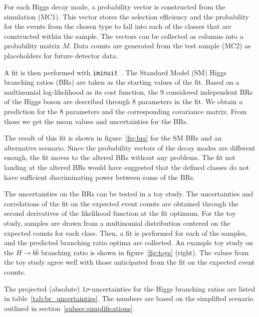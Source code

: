 \documentclass[11pt, hidelinks, a4paper]{scrartcl}
\begin{document}
For each Higgs decay mode, a probability vector is
constructed from the simulation (MC1).
This vector stores the selection efficiency and the probability
for the events from the chosen type to fall into each of the classes
that are constructed within the sample.
The vectors can be collected as columns into a probability matrix $M$.
Data counts are generated from the test sample (MC2)
as placeholders for future detector data.

A fit is then performed with \texttt{iminuit}~\cite{Minuit,iminuit}.
The Standard Model (SM) Higgs branching ratios (BRs)
are taken
as the starting values of the fit.
Based on a multinomial log-likelihood as its cost function,
the 9 considered independent BRs of the Higgs boson
are described through 8 parameters in the fit.
We obtain a prediction for the 8 parameters
and the corresponding covariance matrix.
From those we get the mean values and uncertainties for the BRs.

The result of this fit is shown in figure~\ref{fig:brs} for
the SM BRs and an alternative scenario.
Since the probability vectors of the decay modes are different enough,
the fit moves to the altered BRs without any problems.
The fit not landing at the altered BRs
would have suggested that the defined classes
do not have sufficient discriminating power
between some of the BRs.

The uncertainties on the BRs can be tested in a toy study.
The uncertainties and correlations of the fit on the expected event counts
are obtained through the second derivatives of the likelihood function
at the fit optimum.
For the toy study, samples are drawn from a multinomial distribution centered on the
expected counts for each class.
Then, a fit is performed for each of the samples, and the predicted
branching ratio optima are collected.
An example toy study on the $H \to b \bar{b}$ branching ratio is shown in
figure~\ref{fig:toys} (right).
The values from the toy study agree well with those anticipated
from the fit on the expected event counts.

The projected (absolute) $1 \sigma$-uncertainties for the Higgs branching ratios
are listed in table~\ref{tab:br_uncertainties}.
The numbers are based on the simplified scenario
outlined in section~\ref{subsec:simplifications}.
\end{document}
